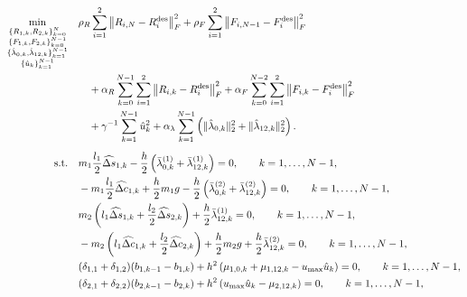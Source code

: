\begin{subequations}
\label{eq:forced_acrobot_reduced_model2_pop}
\begin{align}
\min_{\substack{
\{R_{1,k},R_{2,k}\}_{k=0}^{N}\\
\{F_{1,k},F_{2,k}\}_{k=0}^{N-1}\\
\{\hat\lambda_{0,k},\hat\lambda_{12,k}\}_{k=1}^{N-1}\\
\{\hat u_k\}_{k=1}^{N-1}}}
\quad
&
\rho_R
\sum_{i=1}^{2}
\left\|
R_{i,N}-R_i^{\mathrm{des}}
\right\|_F^2
+
\rho_F
\sum_{i=1}^{2}
\left\|
F_{i,N-1}-F_i^{\mathrm{des}}
\right\|_F^2
\notag\\
&\quad
+
\alpha_R
\sum_{k=0}^{N-1}
\sum_{i=1}^{2}
\left\|
R_{i,k}-R_i^{\mathrm{des}}
\right\|_F^2
+
\alpha_F
\sum_{k=0}^{N-2}
\sum_{i=1}^{2}
\left\|
F_{i,k}-F_i^{\mathrm{des}}
\right\|_F^2
\notag\\
&\quad
+
\gamma^{-1}
\sum_{k=1}^{N-1}
\hat u_k^2
+
\alpha_\lambda
\sum_{k=1}^{N-1}
\left(
\|\hat\lambda_{0,k}\|_2^2
+
\|\hat\lambda_{12,k}\|_2^2
\right).
\label{eq:forced_acrobot_reduced_model2_obj}
\\[0.5em]
\mathrm{s.t.}\quad
&
m_1\frac{l_1}{2}\widehat{\Delta s}_{1,k}
-
\frac{h}{2}
\left(
\bar{\lambda}_{0,k}^{(1)}
+
\bar{\lambda}_{12,k}^{(1)}
\right)
=
0,
\qquad
k=1,\ldots,N-1,
\label{eq:forced_acrobot_reduced_model2_trans1x}
\\
&
-
m_1\frac{l_1}{2}\widehat{\Delta c}_{1,k}
+
\frac{h}{2}m_1g
-
\frac{h}{2}
\left(
\bar{\lambda}_{0,k}^{(2)}
+
\bar{\lambda}_{12,k}^{(2)}
\right)
=
0,
\qquad
k=1,\ldots,N-1,
\label{eq:forced_acrobot_reduced_model2_trans1y}
\\
&
m_2
\left(
l_1\widehat{\Delta s}_{1,k}
+
\frac{l_2}{2}\widehat{\Delta s}_{2,k}
\right)
+
\frac{h}{2}
\bar{\lambda}_{12,k}^{(1)}
=
0,
\qquad
k=1,\ldots,N-1,
\label{eq:forced_acrobot_reduced_model2_trans2x}
\\
&
-
m_2
\left(
l_1\widehat{\Delta c}_{1,k}
+
\frac{l_2}{2}\widehat{\Delta c}_{2,k}
\right)
+
\frac{h}{2}m_2g
+
\frac{h}{2}
\bar{\lambda}_{12,k}^{(2)}
=
0,
\qquad
k=1,\ldots,N-1,
\label{eq:forced_acrobot_reduced_model2_trans2y}
\\
&
(\delta_{1,1}+\delta_{1,2})
(b_{1,k-1}-b_{1,k})
+
h^2
\left(
\mu_{1,0,k}
+
\mu_{1,12,k}
-
u_{\max}\hat u_k
\right)
=
0,
\qquad
k=1,\ldots,N-1,
\label{eq:forced_acrobot_reduced_model2_rot1}
\\
&
(\delta_{2,1}+\delta_{2,2})
(b_{2,k-1}-b_{2,k})
+
h^2
\left(
u_{\max}\hat u_k
-
\mu_{2,12,k}
\right)
=
0,
\qquad
k=1,\ldots,N-1,
\label{eq:forced_acrobot_reduced_model2_rot2}
\\

\end{align}
\end{subequations}
